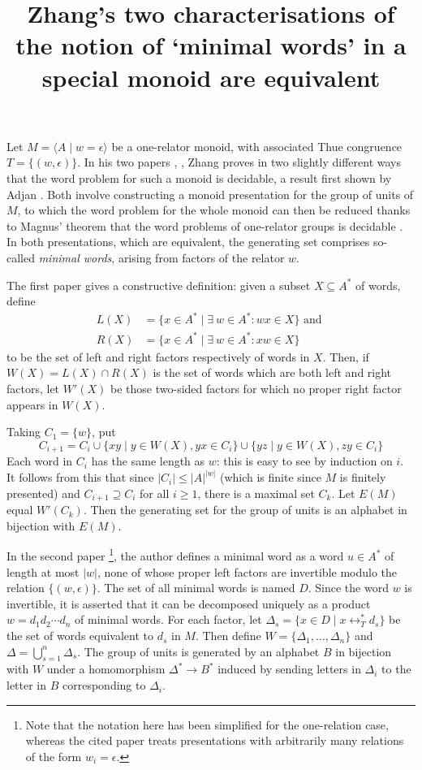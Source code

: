 \documentclass[libertine,widepage]{lmaths}
\title{Zhang's two characterisations of the notion of `minimal words' in a special monoid are equivalent}
\begin{document}
\maketitle

Let $M = \langle A \mid w = \epsilon \rangle$ be a one-relator monoid, with associated Thue congruence $T = \{(w, \epsilon)\}$. In his two papers \cite{Zhang1992}, \cite{Zhang1992a}, Zhang proves in two slightly different ways that the word problem for such a monoid is decidable, a result first shown by Adjan \cite{Adian1966}. Both involve constructing a monoid presentation for the group of units of $M$, to which the word problem for the whole monoid can then be reduced thanks to Magnus' theorem that the word problems of one-relator groups is decidable \cite{Magnus2004}. In both presentations, which are equivalent, the generating set comprises so-called \emph{minimal words}, arising from factors of the relator $w$.

The first paper \cite{Zhang1992a} gives a constructive definition: given a subset $X \subseteq A^*$ of words, define
	\begin{align*}
		L(X) &= \{ x \in A^* \mid \exists\ w \in A^* \colon wx \in X \} \text{ and } \\
		R(X) &= \{ x \in A^* \mid \exists\ w \in A^* \colon xw \in X \}
	\end{align*}
to be the set of left and right factors respectively of words in $X$. Then, if $W(X) = L(X) \cap R(X)$ is the set of words which are both left and right factors, let $W'(X)$ be those two-sided factors for which no proper right factor appears in $W(X)$.

Taking $C_1 = \{w\}$, put
	\[ C_{i+1} = C_i \cup \{ xy \mid y \in W(X), yx \in C_i \} \cup \{ yz \mid y \in W(X), zy \in C_i \} \]
Each word in $C_i$ has the same length as $w$: this is easy to see by induction on $i$. It follows from this that since $|C_i| \le |A|^{|w|}$ (which is finite since $M$ is finitely presented) and $C_{i+1} \supseteq C_i$ for all $i \ge 1$, there is a maximal set $C_k$. Let $E(M)$ equal $W'(C_k)$. Then the generating set for the group of units is an alphabet in bijection with $E(M)$.

In the second paper \cite{Zhang1992}\footnote{Note that the notation here has been simplified for the one-relation case, whereas the cited paper treats presentations with arbitrarily many relations of the form $w_i = \epsilon$.}, the author defines a minimal word as a word $u \in A^*$ of length at most $|w|$, none of whose proper left factors are invertible modulo the relation $\{(w, \epsilon)\}$. The set of all minimal words is named $D$. Since the word $w$ is invertible, it is asserted that it can be decomposed uniquely as a product $w = d_1 d_2 \cdots d_n$ of minimal words. For each factor, let $\Delta_s = \{ x \in D \mid x \leftrightarrow_T^* d_s \}$ be the set of words equivalent to $d_s$ in $M$. Then define $W = \{\Delta_1, \ldots, \Delta_n\}$ and $\Delta = \bigcup_{s = 1}^n \Delta_s$. The group of units is generated by an alphabet $B$ in bijection with $W$ under a homomorphism $\Delta^* \to B^*$ induced by sending letters in $\Delta_i$ to the letter in $B$ corresponding to $\Delta_i$.
\end{document}
